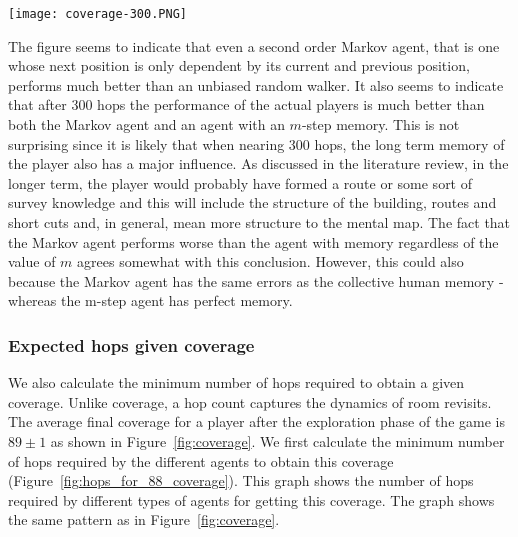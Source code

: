 \begin{figure*}[tb]
    \begin{center}
        \texttt{[image: coverage-300.PNG]}
    \end{center}
    \caption{This figure shows the average coverage after 300 hops as a function of memory size.}
    \label{fig:coverage}
\end{figure*}


The figure seems to indicate that even a second order Markov agent, that is one whose next position is only dependent by its current and previous position, performs much better than an unbiased random walker. It also seems to indicate that after 300 hops the performance of the actual players is much better than both the Markov agent and an agent with an $m$-step memory. This is not surprising since it is likely that when nearing 300 hops, the long term memory of the player also has a major influence. As discussed in the literature review, in the longer term, the player would probably have formed a route or some sort of survey knowledge and this will include the structure of the building, routes and short cuts and, in general, mean more structure to the mental map. The fact that the Markov agent performs worse than the agent with memory regardless of the value of $m$ agrees somewhat with this conclusion. However, this could also because the Markov agent has the same errors as the collective human memory - whereas the m-step agent has perfect memory.



\subsubsection{Expected hops given coverage} %
\label{sec:calculation_5_expected_hops_given_coverage}

We also calculate the minimum number of hops required to obtain a given coverage. Unlike coverage, a hop count captures the dynamics of room revisits. The average final coverage for a player after the exploration phase of the game is $89 \pm 1$ as shown in Figure~\ref{fig:coverage}. We first calculate the minimum number of hops required by the different agents to obtain this coverage (Figure~\ref{fig:hops_for_88_coverage}). This graph shows the number of hops required by different types of agents for getting this coverage. The graph shows the same pattern as in Figure~\ref{fig:coverage}.


